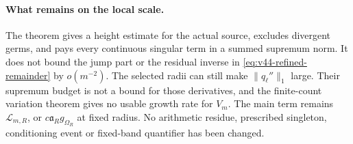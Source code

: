 \paragraph{What remains on the local scale.}
The theorem gives a height estimate for the actual source, excludes
divergent germs, and pays every continuous singular term in a summed
supremum norm. It does not bound the jump part or the residual inverse
in \eqref{eq:v44-refined-remainder} by $o(m^{-2})$. The selected radii
can still make $\|q_\ell''\|_1$ large. Their supremum budget is not a
bound for those derivatives, and the finite-count variation theorem
gives no usable growth rate for $V_m$. The main term remains
$\mathcal L_{m,R}$, or $c\mathfrak a_Rg_{\Omega_R}$ at fixed radius.
No arithmetic residue, prescribed singleton, conditioning event or
fixed-band quantifier has been changed.

